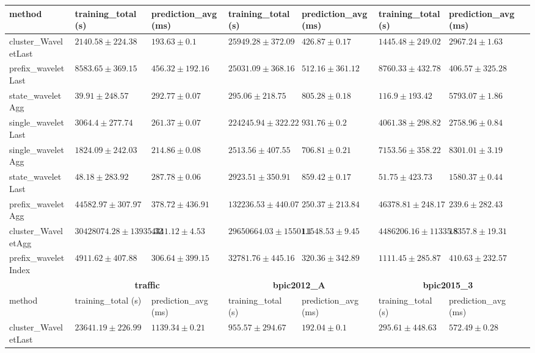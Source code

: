 \documentclass[twoside,11pt]{Latex/Classes/PhDthesisPSnPDF}
\begin{document}
\begin{table}[h]
{\begin{tabular}{llllllll}
		method  & training\_total (s) & prediction\_avg (ms) & training\_total (s) & prediction\_avg (ms) & training\_total (s) & prediction\_avg (ms) \\ \midrule
		cluster\_WaveletLast & $2140.58 \pm 224.38$ & $\mathbf{193.63 \pm 0.1}$ & $25949.28 \pm 372.09$ & $426.87 \pm 0.17$ & $1445.48 \pm 249.02$ & $2967.24 \pm 1.63$ \\ 
		prefix\_waveletLast & $8583.65 \pm 369.15$ & $456.32 \pm 192.16$ & $25031.09 \pm 368.16$ & $512.16 \pm 361.12$ & $8760.33 \pm 432.78$ & $406.57 \pm 325.28$ \\ 
		state\_waveletAgg & $\mathbf{39.91 \pm 248.57}$ & $292.77 \pm 0.07$ & $\mathbf{295.06 \pm 218.75}$ & $805.28 \pm 0.18$ & $116.9 \pm 193.42$ & $5793.07 \pm 1.86$ \\ 
		single\_waveletLast & $3064.4 \pm 277.74$ & $261.37 \pm 0.07$ & $224245.94 \pm 322.22$ & $931.76 \pm 0.2$ & $4061.38 \pm 298.82$ & $2758.96 \pm 0.84$ \\ 
		single\_waveletAgg & $1824.09 \pm 242.03$ & $214.86 \pm 0.08$ & $2513.56 \pm 407.55$ & $706.81 \pm 0.21$ & $7153.56 \pm 358.22$ & $8301.01 \pm 3.19$ \\ 
		state\_waveletLast & $48.18 \pm 283.92$ & $287.78 \pm 0.06$ & $2923.51 \pm 350.91$ & $859.42 \pm 0.17$ & $\mathbf{51.75 \pm 423.73}$ & $1580.37 \pm 0.44$ \\ 
		prefix\_waveletAgg & $44582.97 \pm 307.97$ & $378.72 \pm 436.91$ & $132236.53 \pm 440.07$ & $\mathbf{250.37 \pm 213.84}$ & $46378.81 \pm 248.17$ & $\mathbf{239.6 \pm 282.43}$ \\ 
		cluster\_WaveletAgg & $30428074.28 \pm 13935.32$ & $4341.12 \pm 4.53$ & $29650664.03 \pm 15501.1$ & $11548.53 \pm 9.45$ & $4486206.16 \pm 11335.8$ & $18357.8 \pm 19.31$ \\ 
		prefix\_waveletIndex & $4911.62 \pm 407.88$ & $306.64 \pm 399.15$ & $32781.76 \pm 445.16$ & $320.36 \pm 342.89$ & $1111.45 \pm 285.87$ & $410.63 \pm 232.57$ \\ 
		\bottomrule
		\toprule
		& \multicolumn{2}{c}{{\bfseries traffic}} & \multicolumn{2}{c}{{\bfseries bpic2012\_A}} & \multicolumn{2}{c}{{\bfseries bpic2015\_3}} \\ \cmidrule(lr){2-3} \cmidrule(lr){4-5} \cmidrule(lr){6-7}
		method  & training\_total (s) & prediction\_avg (ms) & training\_total (s) & prediction\_avg (ms) & training\_total (s) & prediction\_avg (ms) \\ \midrule
		cluster\_WaveletLast & $23641.19 \pm 226.99$ & $1139.34 \pm 0.21$ & $955.57 \pm 294.67$ & $\mathbf{192.04 \pm 0.1}$ & $295.61 \pm 448.63$ & $572.49 \pm 0.28$ \\ 

\end{tabular}}
\end{table}
\end{document}

